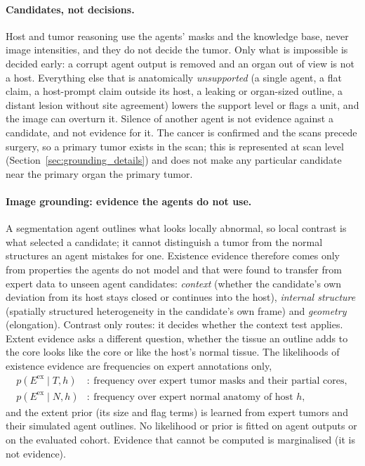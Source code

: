 \documentclass[fleqn,10pt]{olplainarticle}
\begin{document}
\paragraph{Candidates, not decisions.}
Host and tumor reasoning use the agents' masks and the knowledge base, never image intensities, and they do not decide the
tumor. Only what is impossible is decided early: a corrupt agent output is removed and an organ out of view is not a host.
Everything else that is anatomically \emph{unsupported} (a single agent, a flat claim, a host-prompt claim outside its
host, a leaking or organ-sized outline, a distant lesion without site agreement) lowers the support level or flags a unit, and the
image can overturn it. Silence of another agent is not evidence against a candidate, and not evidence for it. The cancer is
confirmed and the scans precede surgery, so a primary tumor exists in the scan; this is represented at scan level
(Section~\ref{sec:grounding_details}) and does not make any particular candidate near the primary organ the primary
tumor.

\paragraph{Image grounding: evidence the agents do not use.}
A segmentation agent outlines what looks locally abnormal, so local contrast is what selected a candidate; it cannot
distinguish a tumor from the normal structures an agent mistakes for one. Existence evidence therefore comes only from
properties the agents do not model and that were found to transfer from expert data to unseen agent candidates:
\emph{context} (whether the candidate's own deviation from its host stays closed or continues into the host),
\emph{internal structure} (spatially structured heterogeneity in the candidate's own frame) and \emph{geometry}
(elongation). Contrast only routes: it decides whether the context test applies. Extent evidence asks a different
question, whether the tissue an outline adds to the core looks like the core or like the host's normal tissue. The
likelihoods of existence evidence are frequencies on expert annotations only,
\begin{equation}
\label{eq:likelihoods}
\begin{aligned}
p(E^{\mathrm{ex}}\mid T,h)&:\ \text{frequency over expert tumor masks and their partial cores},\\
p(E^{\mathrm{ex}}\mid N,h)&:\ \text{frequency over expert normal anatomy of host }h,
\end{aligned}
\end{equation}
and the extent prior (its size and flag terms) is learned from expert tumors and their simulated agent outlines. No
likelihood or prior is fitted on agent outputs or on the evaluated cohort. Evidence that cannot be computed is
marginalised (it is not evidence).
\end{document}
